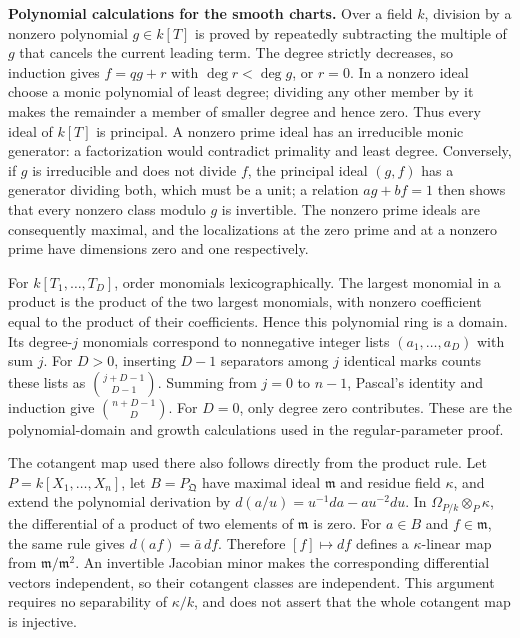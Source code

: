 \documentclass[11pt,a4paper,openany]{report}
\begin{document}
\textbf{Polynomial calculations for the smooth charts.} Over a field \(k\), division by a nonzero polynomial \(g\in k[T]\) is proved by repeatedly subtracting the multiple of \(g\) that cancels the current leading term. The degree strictly decreases, so induction gives \(f=qg+r\) with \(\deg r<\deg g\), or \(r=0\). In a nonzero ideal choose a monic polynomial of least degree; dividing any other member by it makes the remainder a member of smaller degree and hence zero. Thus every ideal of \(k[T]\) is principal. A nonzero prime ideal has an irreducible monic generator: a factorization would contradict primality and least degree. Conversely, if \(g\) is irreducible and does not divide \(f\), the principal ideal \((g,f)\) has a generator dividing both, which must be a unit; a relation \(ag+bf=1\) then shows that every nonzero class modulo \(g\) is invertible. The nonzero prime ideals are consequently maximal, and the localizations at the zero prime and at a nonzero prime have dimensions zero and one respectively.

For \(k[T_1,\ldots,T_D]\), order monomials lexicographically. The largest monomial in a product is the product of the two largest monomials, with nonzero coefficient equal to the product of their coefficients. Hence this polynomial ring is a domain. Its degree-\(j\) monomials correspond to nonnegative integer lists \((a_1,\ldots,a_D)\) with sum \(j\). For \(D>0\), inserting \(D-1\) separators among \(j\) identical marks counts these lists as \(\binom{j+D-1}{D-1}\). Summing from \(j=0\) to \(n-1\), Pascal's identity and induction give \(\binom{n+D-1}{D}\). For \(D=0\), only degree zero contributes. These are the polynomial-domain and growth calculations used in the regular-parameter proof.

The cotangent map used there also follows directly from the product rule. Let \(P=k[X_1,\ldots,X_n]\), let \(B=P_{\mathfrak Q}\) have maximal ideal \(\mathfrak m\) and residue field \(\kappa\), and extend the polynomial derivation by \(d(a/u)=u^{-1}da-au^{-2}du\). In \(\Omega_{P/k}\otimes_P\kappa\), the differential of a product of two elements of \(\mathfrak m\) is zero. For \(a\in B\) and \(f\in\mathfrak m\), the same rule gives \(d(af)=\bar a\,df\). Therefore \([f]\mapsto df\) defines a \(\kappa\)-linear map from \(\mathfrak m/\mathfrak m^2\). An invertible Jacobian minor makes the corresponding differential vectors independent, so their cotangent classes are independent. This argument requires no separability of \(\kappa/k\), and does not assert that the whole cotangent map is injective.
\end{document}
